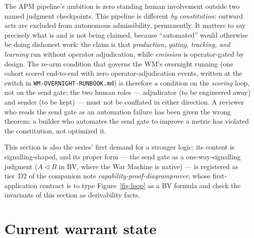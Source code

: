 \documentclass[11pt]{article}
\begin{document}
The APM pipeline's ambition is zero standing human involvement
outside two named judgment checkpoints. This pipeline is different
\emph{by constitution}: outward acts are excluded from autonomous
admissibility, permanently. It matters to say precisely what is and
is not being claimed, because ``automated'' would otherwise be doing
dishonest work: the claim is that \emph{production, gating, tracking,
and learning} run without operator adjudication, while
\emph{emission} is operator-gated by design. The re-arm condition
that governs the WM's overnight running (one cohort scored
end-to-end with zero operator-adjudication events, written at the
switch in \texttt{WM-OVERNIGHT-RUNBOOK.md}) is therefore a condition
on the \emph{scoring} loop, not on the send gate; the two human roles
--- adjudicator (to be engineered away) and sender (to be kept) ---
must not be conflated in either direction. A reviewer who reads the
send gate as an automation failure has been given the wrong theorem;
a builder who automates the send gate to improve a metric has
violated the constitution, not optimized it.

This section is also the series' first demand for a stronger logic:
its content is signalling-shaped, and its proper form --- the send
gate as a one-way-signalling judgment ($A \triangleleft B$ in BV,
where the War Machine is native) --- is registered as tier~D2 of the
companion note \emph{capability-proof-diagramprover}, whose
first-application contract is to type Figure~\ref{fig:loop} as a BV
formula and check the invariants of this section as derivability
facts.

\section{Current warrant state}
\end{document}
